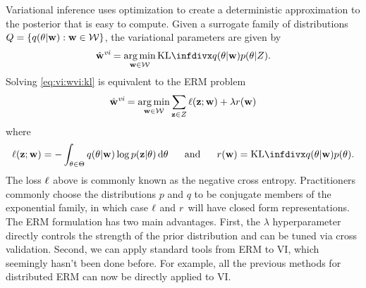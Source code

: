 \documentclass[thesis.tex]{subfiles}
\newcommand{\wvi}{\hat\w^\textit{vi}}
\begin{document}
Variational inference uses optimization to create a deterministic approximation to the posterior that is easy to compute.
Given a surrogate family of distributions $Q = \{ q(\theta|\mathbf w) : \mathbf w\in{\mathcal W} \}$,
the variational parameters are given by
\begin{equation}
    \label{eq:vi:wvi:kl}
    \wvi = \argmin_{\w\in\W} \kl{q(\theta|\w)}{p(\theta|Z)}
    .
\end{equation}
Solving \eqref{eq:vi:wvi:kl} is equivalent to the ERM problem
\begin{equation}
    \label{eq:vi:wvi:erm}
    \wvi = \argmin_{\w\in\W} \sum_{\z\in Z} \loss(\z;\w) + \lambda\reg(\w)
\end{equation}
where
\begin{equation}
    \loss(\z;\w) = -\int_{\theta\in\Theta} q(\theta|\w)\log p(\z|\theta) \dd\theta
    ~~~~~\text{and}~~~~~
    \reg(\w) = \kl{q(\theta|\w)}{p(\theta)}
    .
\end{equation}
The loss $\ell$ above is commonly known as the negative cross entropy.
Practitioners commonly choose the distributions $p$ and $q$ to be conjugate members of the exponential family,
in which case $\ell$ and $r$ will have closed form representations.
The ERM formulation has two main advantages.
First, the $\lambda$ hyperparameter directly controls the strength of the prior distribution and can be tuned via cross validation.
Second, we can apply standard tools from ERM to VI,
which seemingly hasn't been done before.
For example, all the previous methods for distributed ERM can now be directly applied to VI.
\end{document}
